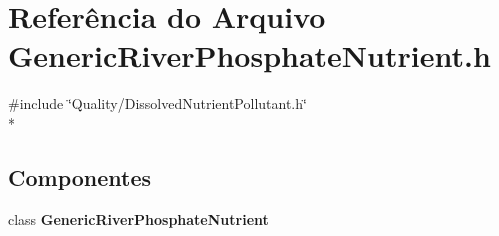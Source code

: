 \section{Referência do Arquivo Generic\+River\+Phosphate\+Nutrient.\+h}
\label{_generic_river_phosphate_nutrient_8h}
{\ttfamily \#include \char`\"{}Quality/\+Dissolved\+Nutrient\+Pollutant.\+h\char`\"{}}\\*
\subsection*{Componentes}
\begin{DoxyCompactItemize}
\item 
class {\bf Generic\+River\+Phosphate\+Nutrient}
\end{DoxyCompactItemize}
